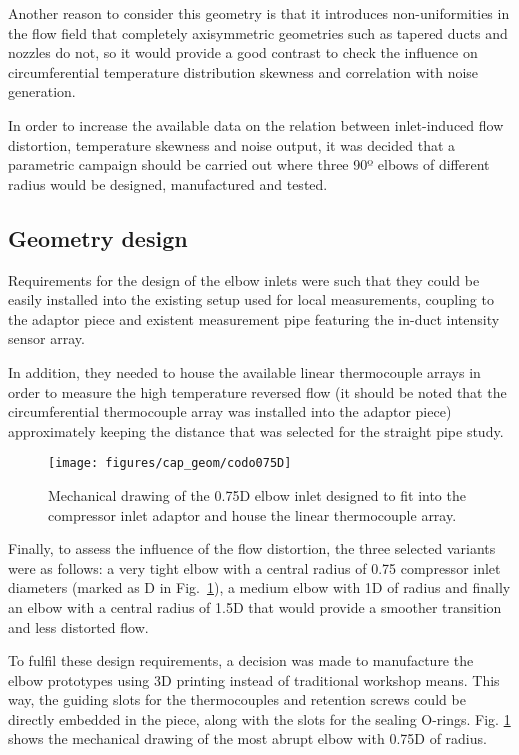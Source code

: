Another reason to consider this geometry is that it introduces non-unifor\-mi\-ties in the flow field that completely axisymmetric geometries such as tapered ducts and nozzles do not, so it would provide a good contrast to check the influence on circumferential temperature distribution skewness and correlation with noise generation.

In order to increase the available data on the relation between inlet-induced flow distortion, temperature skewness and noise output, it was decided that a parametric campaign should be carried out where three 90º elbows of different radius would be designed, manufactured and tested.

\subsection{Geometry design}

Requirements for the design of the elbow inlets were such that they could be easily installed into the existing setup used for local measurements, coupling to the adaptor piece and existent measurement pipe featuring the in-duct intensity sensor array.

In addition, they needed to house the available linear thermocouple arrays in order to measure the high temperature reversed flow (it should be noted that the circumferential thermocouple array was installed into the adaptor piece) approximately keeping the distance that was selected for the straight pipe study.

\begin{figure}[htb!]
\centering
\texttt{[image: figures/cap\_geom/codo075D]}
\caption{Mechanical drawing of the 0.75D elbow inlet designed to fit into the compressor inlet adaptor and house the linear thermocouple array.}
\label{fig:codo075D}
\end{figure}

Finally, to assess the influence of the flow distortion, the three selected variants were as follows: a very tight elbow with a central radius of 0.75 compressor inlet diameters (marked as D in Fig.~\ref{fig:codo075D}), a medium elbow with 1D of radius and finally an elbow with a central radius of 1.5D that would provide a smoother transition and less distorted flow.

To fulfil these design requirements, a decision was made to manufacture the elbow prototypes using 3D printing instead of traditional workshop means. This way, the guiding slots for the thermocouples and retention screws could be directly embedded in the piece, along with the slots for the sealing O-rings. Fig. \ref{fig:codo075D} shows the mechanical drawing of the most abrupt elbow with 0.75D of radius.

